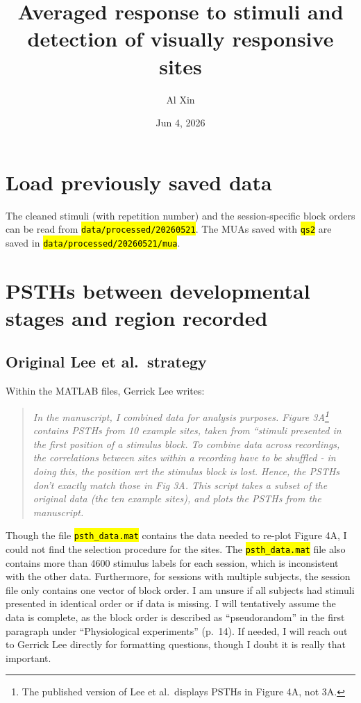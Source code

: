 \documentclass[
  10pt,
  letterpaper,
  DIV=11,
  numbers=noendperiod]{scrartcl}
\title{Averaged response to stimuli and detection of visually responsive
sites}
\author{Al Xin}
\date{Jun 4, 2026}
\let\OldTexttt\texttt
\renewcommand{\texttt}[1]{\OldTexttt{\hl{#1}}}
\begin{document}
\maketitle


\section{Load previously saved data}\label{load-previously-saved-data}

The cleaned stimuli (with repetition number) and the session-specific
block orders can be read from \texttt{data/processed/20260521}. The MUAs
saved with \texttt{qs2} are saved in
\texttt{data/processed/20260521/mua}.

\section{PSTHs between developmental stages and region
recorded}\label{psths-between-developmental-stages-and-region-recorded}

\subsection{Original Lee et
al.~strategy}\label{original-lee-et-al.-strategy}

Within the MATLAB files, Gerrick Lee writes:

\begin{quote}
\emph{In the manuscript, I combined data for analysis purposes. Figure
3A\footnote{The published version of Lee et al.~displays PSTHs in Figure
  4A, not 3A.} contains PSTHs from 10 example sites, taken from
``stimuli presented in the first position of a stimulus block. To
combine data across recordings, the correlations between sites within a
recording have to be shuffled - in doing this, the position wrt the
stimulus block is lost. Hence, the PSTHs don't exactly match those in
Fig 3A. This script takes a subset of the original data (the ten example
sites), and plots the PSTHs from the manuscript.}
\end{quote}

Though the file \texttt{psth\_data.mat} contains the data needed to
re-plot Figure 4A, I could not find the selection procedure for the
sites. The \texttt{psth\_data.mat} file also contains more than 4600
stimulus labels for each session, which is inconsistent with the other
data. Furthermore, for sessions with multiple subjects, the session file
only contains one vector of block order. I am unsure if all subjects had
stimuli presented in identical order or if data is missing. I will
tentatively assume the data is complete, as the block order is described
as ``pseudorandom'' in the first paragraph under ``Physiological
experiments'' (p.~14). If needed, I will reach out to Gerrick Lee
directly for formatting questions, though I doubt it is really that
important.
\end{document}
